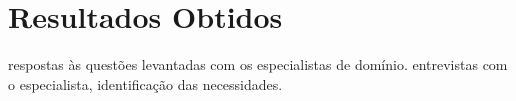 \chapter{Resultados Obtidos}
	respostas às questões levantadas com os especialistas de domínio. entrevistas com o especialista, identificação das necessidades.
